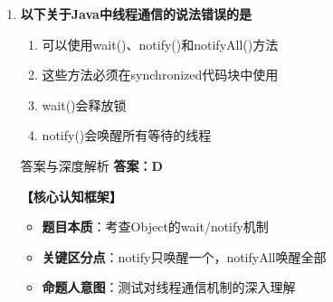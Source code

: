 \documentclass[12pt, a4paper]{ctexart}
\begin{document}
\begin{enumerate}[label=\textbf{\arabic*.}]
\begin{bluebox}{答案与深度解析}
\begin{itemize}[label={}, leftmargin=*, nosep]
		      \end{itemize}

		      \textbf{【应背诵知识点（命题人思维版）】}
		      \begin{enumerate}[label={}, leftmargin=*, nosep]
			      \item \textbf{线程安全条件}：
			            \begin{itemize}[label={}, nosep]
				            \item 多个线程共享数据
				            \item 至少有一个线程修改数据
			            \end{itemize}

			      \item \textbf{高频陷阱清单}：
			            \begin{itemize}[label={}, nosep]
				            \item 陷阱1："只读不需要同步" → 正确
				            \item 陷阱2："有写操作就一定要同步" → 正确
			            \end{itemize}
		      \end{enumerate}

		      \textbf{【命题趋势与实战策略】}

		      \textbf{考场秒杀技巧}：共享资源有写必须同步，只读无需同步
	      \end{bluebox}

	\item \textbf{以下关于Java中线程通信的说法错误的是}
	      \begin{enumerate}[label=\Alph*.]
		      \item 可以使用wait()、notify()和notifyAll()方法
		      \item 这些方法必须在synchronized代码块中使用
		      \item wait()会释放锁
		      \item notify()会唤醒所有等待的线程
	      \end{enumerate}

	      \begin{bluebox}{答案与深度解析}
		      \textbf{答案：D}

		      \textbf{【核心认知框架】}
		      \begin{itemize}[label={}, leftmargin=*, nosep]
			      \item \textbf{题目本质}：考查Object的wait/notify机制
			      \item \textbf{关键区分点}：notify只唤醒一个，notifyAll唤醒全部
			      \item \textbf{命题人意图}：测试对线程通信机制的深入理解
		      \end{itemize}


\end{bluebox}
\end{enumerate}
\end{document}
